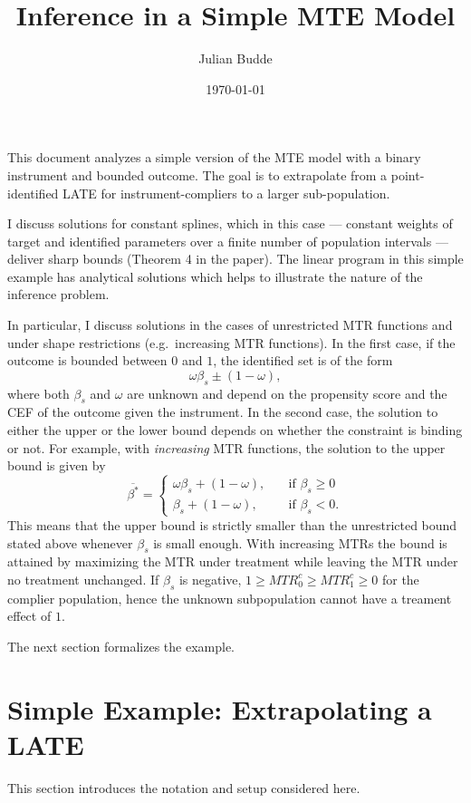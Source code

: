\documentclass[11pt,a4paper,english]{article} %
\title{Inference in a Simple MTE Model}
\author{Julian Budde}
\date{\today}
\numberwithin{equation}{section}
\numberwithin{figure}{section}
\numberwithin{table}{section}
\theoremstyle{definition}
\theoremstyle{remark}
\begin{document}
\maketitle
This document analyzes a simple version of the MTE model with a binary instrument and bounded outcome.
The goal is to extrapolate from a point-identified LATE for instrument-compliers to a larger sub-population.

I discuss solutions for constant splines, which in this case --- constant weights of target and identified parameters over a finite number of population intervals --- deliver sharp bounds (Theorem 4 in the paper).
The linear program in this simple example has analytical solutions which helps to illustrate the nature of the inference problem.

In particular, I discuss solutions in the cases of unrestricted MTR functions and under shape restrictions (e.g.\ increasing MTR functions).
In the first case, if the outcome is bounded between $0$ and $1$, the identified set is of the form
\begin{equation}
	\omega \beta_s \pm (1 - \omega),
\end{equation}
where both $\beta_s$ and $\omega$ are unknown and depend on the propensity score and the CEF of the outcome given the instrument.
In the second case, the solution to either the upper or the lower bound depends on whether the constraint is binding or not.
For example, with \textit{increasing} MTR functions, the solution to the upper bound is given by
\begin{equation}
	\overline{\beta^*}=
	\begin{cases}
		\omega \beta_s + (1 - \omega),& \quad \text{if } \beta_s \geq 0\\
		\beta_s + (1 - \omega),              & \quad \text{if } \beta_s < 0.
	\end{cases}
\end{equation}
This means that the upper bound is strictly smaller than the unrestricted bound stated above whenever $\beta_s$ is small enough.
With increasing MTRs the bound is attained by maximizing the MTR under treatment while leaving the MTR under no treatment unchanged.
If $\beta_s$ is negative, $1 \geq MTR^c_0 \geq MTR^c_1 \geq 0$ for the complier population, hence the unknown subpopulation cannot have a treament effect of $1$.

The next section formalizes the example.

\section{Simple Example: Extrapolating a LATE}
This section introduces the notation and setup considered here.
\end{document}
